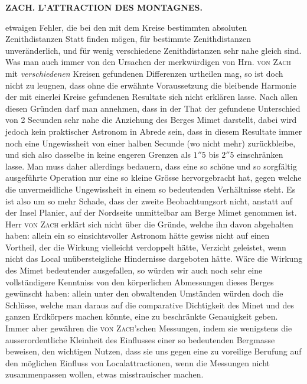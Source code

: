 \clearpage
{}
\noindent\makebox[10mm][l]{}%
\parbox[b]{\dimexpr\textwidth-20mm\relax}{\centering\small\textbf{ZACH. L’ATTRACTION DES MONTAGNES.}}%
\par\nobreak\medskip
\noindent etwaigen Fehler, die bei den mit dem Kreise bestimmten absoluten Zenithdistanzen Statt finden mögen, für bestimmte Zenithdistanzen unveränderlich, und für wenig verschiedene Zenithdistanzen sehr nahe gleich sind. Was man auch immer von den Ursachen der merkwürdigen von Hrn. \textsc{von Zach} mit \emph{verschiedenen} Kreisen gefundenen Differenzen urtheilen mag, so ist doch nicht zu leugnen, dass ohne die erwähnte Voraussetzung die bleibende Harmonie der mit einerlei Kreise gefundenen Resultate sich nicht erklären lasse. Nach allen diesen Gründen darf man annehmen, dass in der That der gefundene Unterschied von 2 Secunden sehr nahe die Anziehung des Berges Mimet darstellt, dabei wird jedoch kein praktischer Astronom in Abrede sein, dass in diesem Resultate immer noch eine Ungewissheit von einer halben Secunde (wo nicht mehr) zurückbleibe, und sich also dasselbe in keine engeren Grenzen als $1''5$ bis $2''5$ einschränken lasse. Man muss daher allerdings bedauern, dass eine so schöne und so sorgfältig ausgeführte Operation nur eine so kleine Grösse hervorgebracht hat, gegen welche die unvermeidliche Ungewissheit in einem so bedeutenden Verhältnisse steht. Es ist also um so mehr Schade, dass der zweite Beobachtungsort nicht, anstatt auf der Insel Planier, auf der Nordseite unmittelbar am Berge Mimet genommen ist. Herr \textsc{von Zach} erklärt sich nicht über die Gründe, welche ihn davon abgehalten haben: allein ein so einsichtsvoller Astronom hätte gewiss nicht auf einen Vortheil, der die Wirkung vielleicht verdoppelt hätte, Verzicht geleistet, wenn nicht das Local unübersteigliche Hindernisse dargeboten hätte. Wäre die Wirkung des Mimet bedeutender ausgefallen, so würden wir auch noch sehr eine vollständigere Kenntniss von den körperlichen Abmessungen dieses Berges gewünscht haben: allein unter den obwaltenden Umständen würden doch die Schlüsse, welche man daraus auf die comparative Dichtigkeit des Minet und des ganzen Erdkörpers machen könnte, eine zu beschränkte Genauigkeit geben. Immer aber gewähren die \textsc{von Zach}'schen Messungen, indem sie wenigstens die ausserordentliche Kleinheit des Einflusses einer so bedeutenden Bergmasse beweisen, den wichtigen Nutzen, dass sie uns gegen eine zu voreilige Berufung auf den möglichen Einfluss von Localattractionen, wenn die Messungen nicht zusammenpassen wollen, etwas misstrauischer machen.


